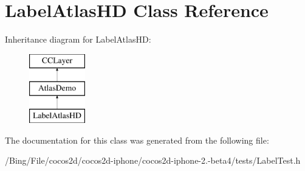\hypertarget{interface_label_atlas_h_d}{\section{Label\-Atlas\-H\-D Class Reference}
\label{interface_label_atlas_h_d}
}
Inheritance diagram for Label\-Atlas\-H\-D\-:\begin{figure}[H]
\begin{center}
\leavevmode
\includegraphics[height=3.000000cm]{interface_label_atlas_h_d}
\end{center}
\end{figure}


The documentation for this class was generated from the following file\-:\begin{DoxyCompactItemize}
\item 
/\-Bing/\-File/cocos2d/cocos2d-\/iphone/cocos2d-\/iphone-\/2.-\/beta4/tests/Label\-Test.\-h\end{DoxyCompactItemize}

